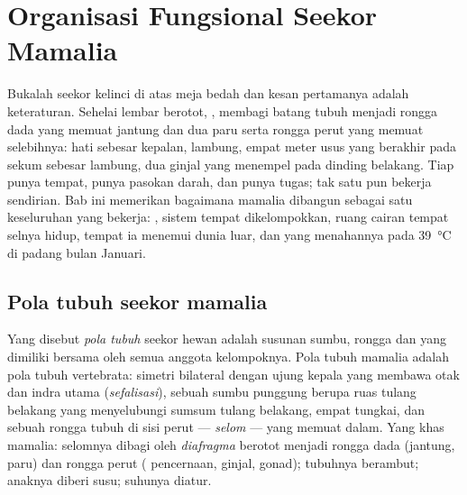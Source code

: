 \chapter{Organisasi Fungsional Seekor Mamalia}\label{ch:b1:mammal-organization}

Bukalah seekor kelinci di atas meja bedah dan kesan pertamanya adalah
keteraturan. Sehelai lembar berotot, , membagi batang tubuh
menjadi rongga dada yang memuat jantung dan dua paru serta rongga perut
yang memuat selebihnya: hati sebesar kepalan, lambung, empat meter usus
yang berakhir pada sekum sebesar lambung, dua ginjal yang menempel pada
dinding belakang. Tiap  punya tempat, punya pasokan darah, dan
punya tugas; tak satu pun bekerja sendirian. Bab ini memerikan bagaimana
mamalia dibangun sebagai satu keseluruhan yang bekerja: ,
sistem tempat  dikelompokkan, ruang cairan tempat selnya hidup,
 tempat ia menemui dunia luar, dan  yang
menahannya pada \qty{39}{\celsius} di padang bulan Januari.

\section{Pola tubuh seekor mamalia}

\begin{definition}\label{def:b1:mammal-organization:bodyplan}
Yang disebut \emph{pola tubuh} seekor hewan adalah
susunan sumbu, rongga dan  yang dimiliki bersama oleh semua
anggota kelompoknya. Pola tubuh mamalia adalah pola tubuh vertebrata:
simetri bilateral dengan ujung kepala yang membawa otak dan indra utama
(\emph{sefalisasi}), sebuah sumbu punggung berupa
ruas tulang belakang yang menyelubungi sumsum tulang belakang, empat
tungkai, dan sebuah rongga tubuh di sisi perut --- \emph{selom}
 --- yang memuat  dalam. Yang khas mamalia: selomnya
dibagi oleh \emph{diafragma} berotot menjadi rongga
dada (jantung, paru) dan rongga perut ( pencernaan, ginjal,
gonad); tubuhnya berambut; anaknya diberi susu; suhunya diatur.
\end{definition}

